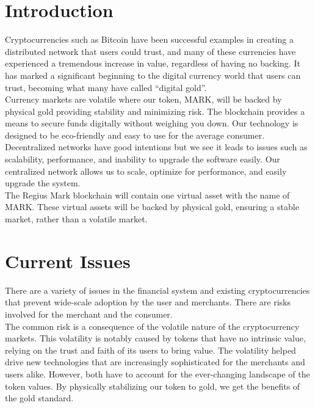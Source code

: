 \documentclass[12pt,a4paper]{article}
\begin{document}
  \newpage
  \tableofcontents
  \newpage

  \section{Introduction}
  Cryptocurrencies such as Bitcoin have been successful examples in creating a
  distributed network that users could trust, and many of these currencies have
  experienced a tremendous increase in value, regardless of having no backing.
  It has marked a significant beginning to the digital currency world that users
  can trust, becoming what many have called ``digital gold''.\\

  Currency markets are volatile where our token, MARK, will be backed by
  physical gold providing stability and minimizing risk. The blockchain provides
  a means to secure funds digitally without weighing you down. Our technology is
  designed to be eco-friendly and easy to use for the average consumer.\\

  Decentralized networks have good intentions but we see it leads to issues such
  as scalability, performance, and inability to upgrade the software easily. Our
  centralized network allows us to scale, optimize for performance, and easily
  upgrade the system.\\

  The Regius Mark blockchain will contain one virtual asset with the name of
  MARK. These virtual assets will be backed by physical gold,
  ensuring a stable market, rather than a volatile market.

  \section{Current Issues}
  There are a variety of issues in the financial system and existing
  cryptocurrencies that prevent wide-scale adoption by the user and
  merchants. There are risks involved for the merchant and the consumer.\\

  The common risk is a consequence of the volatile nature of the cryptocurrency
  markets. This volatility is notably caused by tokens that have no intrinsic
  value, relying on the trust and faith of its users to bring value. The
  volatility helped drive new technologies that are increasingly sophisticated
  for the merchants and users alike. However, both have to account for the
  ever-changing landscape of the token values. By physically stabilizing our
  token to gold, we get the benefits of the gold standard.\\
\end{document}
